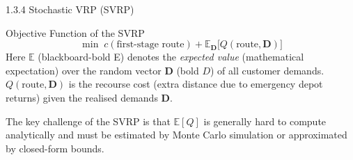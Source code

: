 \documentclass[aspectratio=169,10pt]{beamer}
\begin{document}
\begin{frame}[allowframebreaks]{1.3.4 Stochastic VRP (SVRP)}
\begin{block}{Objective Function of the SVRP}
\[
  \min\; c(\text{first-stage route}) + \mathbb{E}_{\boldsymbol{D}}\bigl[Q(\text{route}, \boldsymbol{D})\bigr]
\]
Here $\mathbb{E}$ (blackboard-bold E) denotes the \emph{expected value} (mathematical
expectation) over the random vector $\boldsymbol{D}$ (bold $D$) of all customer demands.
$Q(\text{route}, \boldsymbol{D})$ is the recourse cost (extra distance due to emergency
depot returns) given the realised demands $\boldsymbol{D}$.
\end{block}

The key challenge of the SVRP is that $\mathbb{E}[Q]$ is generally hard to compute
analytically and must be estimated by Monte Carlo simulation or approximated by
closed-form bounds.

\end{frame}
\end{document}
